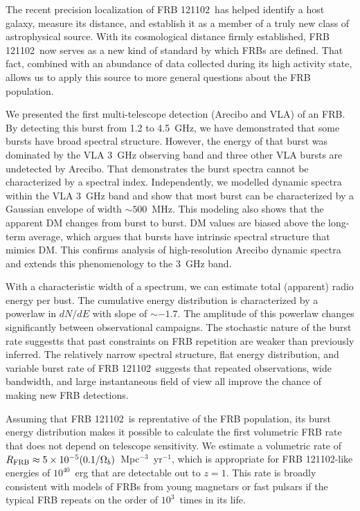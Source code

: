 \documentclass[twocolumn]{aastex61}
\newcommand{\frb}{FRB 121102}
\begin{document}
The recent precision localization of \frb\ has helped identify a host galaxy, measure its distance, and establish it as a member of a truly new class of astrophysical source. With its cosmological distance firmly established, \frb\ now serves as a new kind of standard by which FRBs are defined. That fact, combined with an abundance of data collected during its high activity state, allows us to apply this source to more general questions about the FRB population.

We presented the first multi-telescope detection (Arecibo and VLA) of an FRB. By detecting this burst from 1.2 to 4.5~GHz, we have demonstrated that some bursts have broad spectral structure. However, the energy of that burst was dominated by the VLA 3~GHz observing band and three other VLA bursts are undetected by Arecibo. That demonstrates the burst spectra cannot be characterized by a spectral index. Independently, we modelled dynamic spectra within the VLA 3~GHz band and show that most burst can be characterized by a Gaussian envelope of width $\sim500$\ MHz. This modeling also shows that the apparent DM changes from burst to burst. DM values are biased above the long-term average, which argues that bursts have intrinsic spectral structure that mimics DM. This confirms analysis of high-resolution Arecibo dynamic spectra and extends this phenomenology to the 3~GHz band.

With a characteristic width of a spectrum, we can estimate total (apparent) radio energy per bust. The cumulative energy distribution is characterized by a powerlaw in $dN/dE$ with slope of $\sim-1.7$. The amplitude of this powerlaw changes significantly between observational campaigns. The stochastic nature of the burst rate suggestts that past constraints on FRB repetition are weaker than previously inferred. The relatively narrow spectral structure, flat energy distribution, and variable burst rate of \frb\ suggests that repeated observations, wide bandwidth, and large instantaneous field of view all improve the chance of making new FRB detections.

Assuming that \frb\ is reprentative of the FRB population, its burst energy distribution makes it possible to calculate the first volumetric FRB rate that does not depend on telescope sensitivity. We estimate a volumetric rate of $R_{\rm{FRB}} \approx 5\times10^{-5} (0.1/\Omega_b)$\ Mpc$^{-3}$\ yr$^{-1}$, which is appropriate for \frb-like energies of $10^{40}$\ erg that are detectable out to $z=1$. This rate is broadly consistent with models of FRBs from young magnetars or fast pulsars if the typical FRB repeats on the order of $10^3$\ times in its life.
\end{document}
